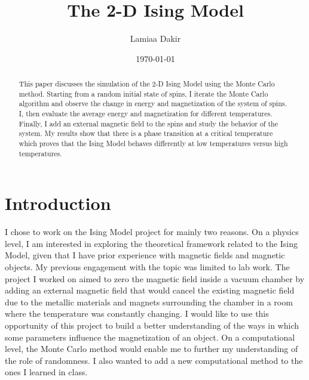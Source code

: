 \documentclass[aps,twocolumn,twoside,secnumarabic,balancelastpage,amsmath,amssymb,nofootinbib,hyperref=pdftex]{revtex4}
\begin{document}
\title{The 2-D Ising Model}
\author{Lamiaa Dakir}
\date{\today}


 

\begin{abstract}
This paper discusses the simulation of the 2-D Ising Model using the Monte Carlo method. Starting from a random initial state of spins, I iterate the Monte Carlo algorithm and observe the change in energy and magnetization of the system of spins. I, then evaluate the average energy and magnetization for different temperatures. Finally, I add an external magnetic field to the spins and study the behavior of the system. My results show that there is a phase transition at a critical temperature which proves that the Ising Model behaves differently at low temperatures versus high temperatures.
\end{abstract}

\maketitle


\section{Introduction}
I chose to work on the Ising Model project for mainly two reasons. On a physics level, I am interested in exploring the theoretical framework related to the Ising Model, given that I have prior experience with magnetic fields and magnetic objects. My previous engagement with the topic was limited to lab work. The project I worked on aimed to zero the magnetic field inside a vacuum chamber by adding an external magnetic field that would cancel the existing magnetic field due to the metallic materials and magnets surrounding the chamber in a room where the temperature was constantly changing. I would like to use this opportunity of this project to build a better understanding of the ways in which some parameters influence the magnetization of an object. On a computational level, the Monte Carlo method would enable me to further my understanding of the role of randomness. I also wanted to add a new computational method to the ones I learned in class. 
\end{document}
